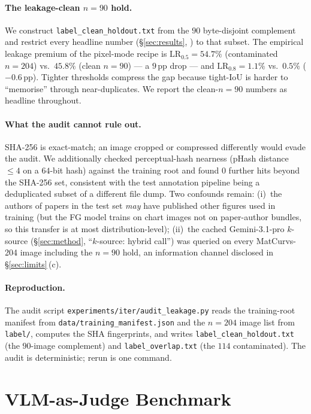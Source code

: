 \documentclass{article}
\begin{document}
\paragraph{The leakage-clean $n{=}90$ hold.}
We construct \texttt{label\_clean\_holdout.txt} from the $90$
byte-disjoint complement and restrict every headline number
(\S\ref{sec:results}, ) to that subset. The
empirical leakage premium of the pixel-mode recipe is
$\mathrm{LR}_{0.5}{=}54.7\%$ (contaminated $n{=}204$) vs.\
$45.8\%$ (clean $n{=}90$) --- a $9$\,pp drop --- and
$\mathrm{LR}_{0.8}{=}1.1\%$ vs.\ $0.5\%$ ($-0.6$\,pp). Tighter
thresholds compress the gap because tight-IoU is harder to
``memorise'' through near-duplicates. We report the
clean-$n{=}90$ numbers as headline throughout.

\paragraph{What the audit cannot rule out.}
SHA-256 is exact-match; an image cropped or compressed differently
would evade the audit. We additionally checked perceptual-hash
nearness (pHash distance $\leq 4$ on a $64$-bit hash) against the
training root and found $0$ further hits beyond the SHA-256 set,
consistent with the test annotation pipeline being a deduplicated
subset of a different file dump. Two confounds remain: (i)~the
authors of papers in the test set \emph{may} have published other
figures used in training (but the FG model trains on chart images
not on paper-author bundles, so this transfer is at most
distribution-level); (ii)~the cached Gemini-3.1-pro $k$-source
(\S\ref{sec:method}, ``$k$-source: hybrid call'') was queried on
every MatCurvs-204 image including the $n{=}90$ hold, an
information channel disclosed in \S\ref{sec:limits}\,(c).

\paragraph{Reproduction.}
The audit script \texttt{experiments/iter/audit\_leakage.py} reads
the training-root manifest from \texttt{data/training\_manifest.json}
and the $n{=}204$ image list from \texttt{label/}, computes the SHA
fingerprints, and writes \texttt{label\_clean\_holdout.txt} (the
$90$-image complement) and \texttt{label\_overlap.txt} (the $114$
contaminated). The audit is deterministic; rerun is one command.

\section{VLM-as-Judge Benchmark}
\label{app:vlm-judge}
\setcounter{table}{0}\setcounter{figure}{0}
\end{document}
